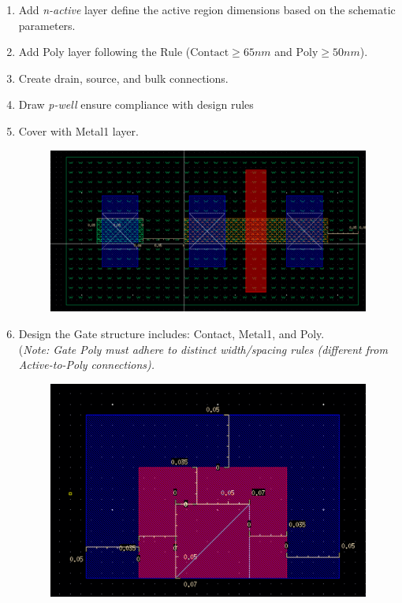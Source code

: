 \begin{enumerate}[leftmargin=*, label = Step \arabic*:]
	\item Add \textit{n-active} layer define the active region dimensions based on the schematic parameters.
	\item Add Poly layer following the Rule ($\text{Contact} \geq 65nm$ and $\text{Poly} \geq 50nm$).
	\item  Create drain, source, and bulk connections.
	\item Draw \textit{p-well} ensure compliance with design rules
	\item Cover with Metal1 layer.
	\begin{figure}[H]
		\centering
		\includegraphics[width=.7\linewidth]{sections/pic/EX4_PMOS_metal.png}
		\label{f_EX4_PMOS_metal}
	\end{figure}
		\item Design the Gate structure includes: Contact, Metal1, and Poly.\\
	(\textit{Note: Gate Poly must adhere to distinct width/spacing rules (different from Active-to-Poly connections).}\\
	\begin{figure}[H]
		\centering
		\includegraphics[width=.7\linewidth]{sections/pic/EX4_PMOS_gate.png}
		\label{f_EX4_PMOS_gate}		
	\end{figure}

\end{enumerate}
